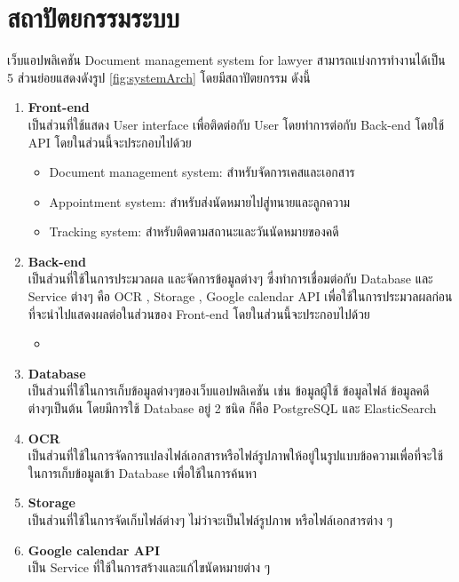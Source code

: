 \documentclass[12pt,oneside,openright,a4paper]{cpe-thai-project}
\begin{document}
\section{สถาปัตยกรรมระบบ}
\hspace*{1cm} เว็บแอปพลิเคชัน Document management system for lawyer สามารถแบ่งการทำงานได้เป็น 5 ส่วนย่อยแสดงดังรูป \ref{fig:systemArch} โดยมีสถาปัตยกรรม ดังนี้
\begin{enumerate}
  \item \textbf{Front-end} \\
  \hspace*{1cm} เป็นส่วนที่ใช้แสดง User interface เพื่อติดต่อกับ User โดยทำการต่อกับ Back-end โดยใช้ API โดยในส่วนนี้จะประกอบไปด้วย
  \begin{itemize}
    \item Document management system: สำหรับจัดการเคสและเอกสาร
    \item Appointment system: สำหรับส่งนัดหมายไปสู่ทนายและลูกความ
    \item Tracking system: สำหรับติดตามสถานะและวันนัดหมายของคดี
  \end{itemize}
  \item \textbf{Back-end} \\
  \hspace*{1cm} เป็นส่วนที่ใช้ในการประมวลผล และจัดการข้อมูลต่างๆ ซึ่งทำการเชื่อมต่อกับ Database และ Service ต่างๆ คือ OCR , Storage , Google calendar API เพื่อใช้ในการประมวลผลก่อนที่จะนำไปแสดงผลต่อในส่วนของ Front-end โดยในส่วนนี้จะประกอบไปด้วย
  \begin{itemize}
    \item 
  \end{itemize}
  \item \textbf{Database} \\
  \hspace*{1cm} เป็นส่วนที่ใช้ในการเก็บข้อมูลต่างๆของเว็บแอปพลิเคชัน เช่น ข้อมูลผู้ใช้ ข้อมูลไฟล์ ข้อมูลคดี ต่างๆเป็นต้น โดยมีการใช้ Database อยู่ 2 ชนิด ก็คือ PostgreSQL และ ElasticSearch 
  \item \textbf{OCR} \\
  \hspace*{1cm} เป็นส่วนที่ใช้ในการจัดการแปลงไฟล์เอกสารหรือไฟล์รูปภาพให้อยู่ในรูปแบบข้อความเพื่อที่จะใช้ในการเก็บข้อมูลเข้า Database เพื่อใช้ในการค้นหา
  \item \textbf{Storage} \\
  \hspace*{1cm} เป็นส่วนที่ใช้ในการจัดเก็บไฟล์ต่างๆ ไม่ว่าจะเป็นไฟล์รูปภาพ หรือไฟล์เอกสารต่าง ๆ 
  \item \textbf{Google calendar API} \\
  \hspace*{1cm} เป็น Service ที่ใช้ในการสร้างและแก้ไขนัดหมายต่าง ๆ
\end{enumerate}
\end{document}
